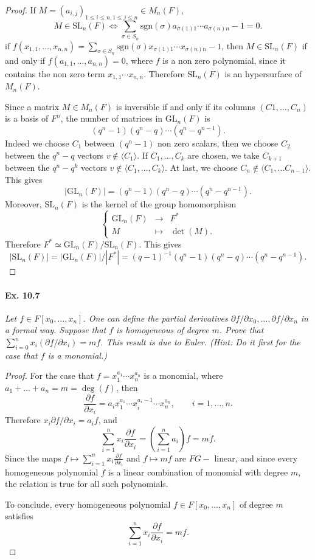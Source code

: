 \documentclass[11pt,a4paper]{article}
\begin{document}
\begin{proof}
If $M = (a_{i,j})_{1\leq i \leq n, 1\leq j \leq n} \in M_n(F)$, 
$$M \in \mathrm{SL}_n(F) \iff \sum_{\sigma \in S_n} \mathrm{sgn}(\sigma) a_{\sigma(1)1}\cdots a_{\sigma(n)n}-1=0.$$
if $f(x_{1,1},\ldots,x_{n,n}) = \sum\limits_{\sigma \in S_n} \mathrm{sgn}(\sigma) x_{\sigma(1)1}\cdots x_{\sigma(n)n}-1$, then  $M \in \mathrm{SL}_n(F)$ if and only if ${f(a_{1,1}, \ldots,a_{n,n}) = 0}$, where $f$ is a non zero polynomial, since it contains the non zero term $x_{1,1}\cdots x_{n,n}$. Therefore $\mathrm{SL}_n(F)$ is an hypersurface of $M_n(F)$.

Since a matrix $M \in M_n(F)$ is inversible if and only if its columns $(C1,\ldots,C_n)$ is a basis of $F^n$, the number of matrices in $\mathrm{GL}_n(F)$ is $$(q^n-1)(q^n-q)\cdots(q^n-q^{n-1}).$$Indeed we choose $C_1$ between $(q^n-1)$ non zero scalars, then we choose $C_2$ between the $q^n-q$ vectors $v  \not \in \langle C_1 \rangle$. If $C_1,\ldots,C_k$ are chosen, we take $C_{k+1}$ between the $q^n -q^k$ vectors $v \not \in \langle C_1,\ldots,C_k \rangle$. At last, we choose $C_n \not \in \langle C_1,\ldots C_{n-1}\rangle$. This gives
$$|\mathrm{GL}_n(F)| = (q^n-1)(q^n-q)\cdots(q^n-q^{n-1}).$$
Moreover, $\mathrm{SL}_n(F)$ is the kernel of the group homomorphism
$$
\left\{
\begin{array}{ccl}
\mathrm{GL}_n(F) & \to & F^*\\
M & \mapsto &\det(M).
\end{array}
\right.
$$
Therefore $F^* \simeq \mathrm{GL}_n(F)/\mathrm{SL}_n(F)$. This gives
$$|\mathrm{SL}_n(F)| = |\mathrm{GL}_n(F)|/ |F^*| = (q-1)^{-1}(q^n-1)(q^n-q)\cdots(q^n-q^{n-1}).$$
\end{proof}

\paragraph{Ex. 10.7} {\it Let $f \in F[x_0,\ldots,x_n]$. One can define the partial derivatives $\partial f/\partial x_0, \ldots,\partial f/ \partial x_n$ in a formal way. Suppose that $f$ is homogeneous of degree $m$. Prove that $\sum_{i=0}^n x_i (\partial f/ \partial x_i) = mf$. This result is due to Euler. (Hint: Do it first for the case that $f$ is a monomial.)
}
\begin{proof}
For the case that $f = x_1^{a_1}\cdots x_n^{a_n}$ is a monomial, where $a_1+ \ldots + a_n = m = \deg(f)$, then
$$\frac{\partial f}{\partial x_i} = a_i x_1^{a_1}\cdots x_i^{a_i - 1}\cdots x_n^{a_n}, \qquad i=1,\ldots,n.$$
Therefore $x_i \partial f/ \partial x_i = a_i f$, and
$$\sum_{i=1}^n x_i \frac{\partial f}{\partial x_i}  =\left (\sum_{i=1}^n a_i \right ) f = m f.$$
Since the maps $f \mapsto \sum_{i=1}^n x_i \frac{\partial f}{\partial x_i} $ and $f \mapsto mf$ are $FG-$ linear, and since every homogeneous polynomial $f$ is a linear combination of monomial with degree $m$, the relation is true for all such polynomials.

To conclude, every homogeneous polynomial $f \in F[x_0,\ldots,x_n]$ of degree $m$ satisfies
$$\sum_{i=1}^n x_i \frac{\partial f}{\partial x_i}  = m f.$$
\end{proof}
\end{document}
